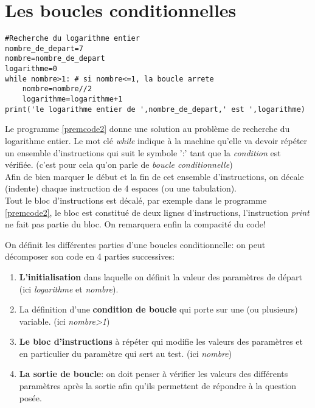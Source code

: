 \section{Les boucles conditionnelles}
\begin{lstlisting}[frame=lines, float=ht,caption={Première boucle \textit{while}},label=premcode2]
#Recherche du logarithme entier  
nombre_de_depart=7
nombre=nombre_de_depart
logarithme=0
while nombre>1: # si nombre<=1, la boucle arrete
    nombre=nombre//2
    logarithme=logarithme+1
print('le logarithme entier de ',nombre_de_depart,' est ',logarithme)
\end{lstlisting}

Le programme \ref{premcode2} donne une solution au problème de recherche du logarithme entier. Le mot clé \textit{while} indique à la machine qu'elle va devoir répéter un ensemble d'instructions qui suit le symbole ':' tant que la \textit{condition} est vérifiée. (c'est pour cela qu'on parle de \textit{boucle conditionnelle})\\
Afin de bien marquer le début et la fin de cet ensemble d'instructions, on décale (indente) chaque instruction de 4 espaces (ou une tabulation).\\
Tout le bloc d'instructions est décalé, par exemple dans le programme \ref{premcode2}, le bloc est constitué de deux lignes d'instructions, l'instruction \textit{print} ne fait pas partie du bloc.
On remarquera enfin la compacité du code!\\
\begin{defi}
On définit les différentes parties d'une boucles conditionnelle: on peut décomposer son code en 4 parties successives:
\begin{enumerate}
	\item \textbf{L'initialisation} dans laquelle on définit la valeur des paramètres de départ (ici \textit{logarithme} et \textit{nombre}).
	\item La définition d'une \textbf{condition de boucle} qui porte sur une (ou plusieurs) variable. (ici \textit{nombre>1})
	\item \textbf{Le bloc d'instructions} à répéter qui modifie les valeurs des paramètres et en particulier du paramètre qui sert au test. (ici \textit{nombre})
	\item \textbf{La sortie de boucle}: on doit penser à vérifier les valeurs des différents paramètres après la sortie afin qu'ils permettent de répondre à la question posée.
\end{enumerate}
\end{defi}

